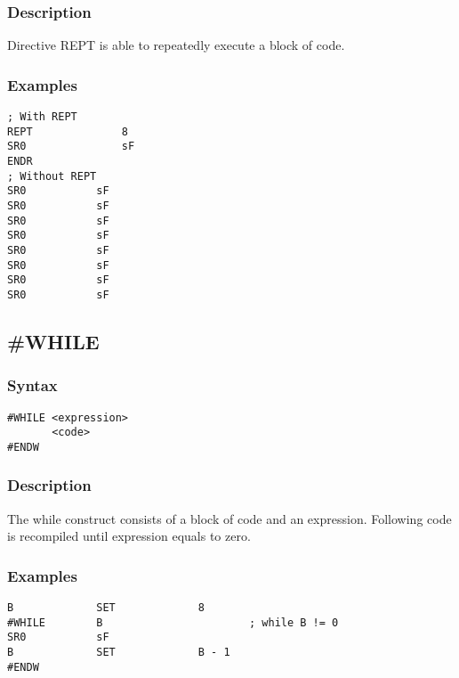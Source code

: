         \subsubsection{Description}
            Directive REPT is able to repeatedly execute a block of code.

        \subsubsection{Examples}
            \verb'; With REPT'\\
            \verb'REPT              8'\\
            \verb'SR0               sF'\\
            \verb'ENDR'\\
            \verb'; Without REPT'\\
            \verb'SR0           sF'\\
            \verb'SR0           sF'\\
            \verb'SR0           sF'\\
            \verb'SR0           sF'\\
            \verb'SR0           sF'\\
            \verb'SR0           sF'\\
            \verb'SR0           sF'\\
            \verb'SR0           sF'

    \subsection{\#WHILE}
        \subsubsection{Syntax}
            \verb'#WHILE <expression>'\\
            \verb'       <code>'\\
            \verb'#ENDW'

        \subsubsection{Description}
            The while construct consists of a block of code and an expression. Following code is recompiled until expression equals to zero.

        \subsubsection{Examples}
            \verb'B             SET             8'\\
            \verb'#WHILE        B                       ; while B != 0'\\
            \verb'SR0           sF'\\
            \verb'B             SET             B - 1'\\
            \verb'#ENDW'

